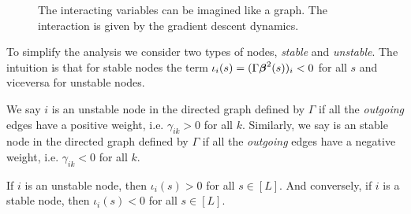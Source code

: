 \documentclass{article} %
\begin{document}
\begin{figure}[h]
\centering
{}
\caption{The interacting variables can be imagined like a graph. The interaction is given by the gradient descent dynamics. }
\end{figure}

To simplify the analysis we consider two types of nodes, \emph{stable} and \emph{unstable}. The intuition is that for stable nodes the term $\iota_i(s) = (\Gamma\mbox{$\mbox{$\boldsymbol{\beta}$}$}^2(s))_i < 0$ for all $s$ and viceversa for unstable nodes. 

\begin{defn}
\label{def:stablenodes}
    We say $i$ is an unstable node in the directed graph defined by $\Gamma$ if all the \emph{outgoing} edges have a positive weight, i.e. $\gamma_{ik} > 0$ for all $k$. Similarly, we say is an stable node in the directed graph defined by $\Gamma$ if all the \emph{outgoing} edges have a negative weight, i.e. $\gamma_{ik} < 0$ for all $k$.
 \end{defn}
 \begin{corr}
     If $i$ is an unstable node, then $\iota_i(s)>0$ for all $s \in [L]$. And conversely, if $i$ is a stable node, then $\iota_i(s)<0$ for all $s \in [L]$.
 \end{corr}
\end{document}
